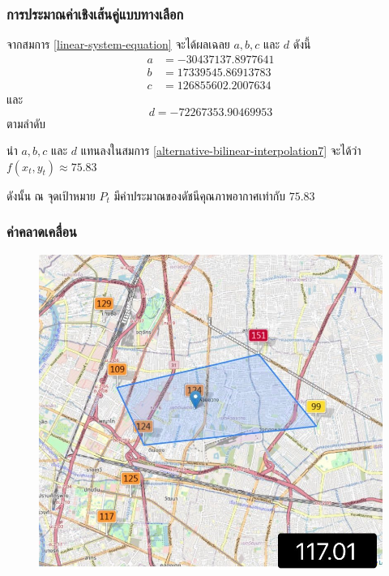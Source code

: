 \documentclass[12pt,aspectratio=169]{beamer}
\begin{document}
\begin{frame}
    \frametitle{การประมาณค่าเชิงเส้นคู่แบบทางเลือก}
   จากสมการ \eqref{linear-system-equation} จะได้ผลเฉลย $a,b,c$ และ $d$ ดังนี้ 
   \begin{align*}
    a&=-30437137.8977641\\
    b&=17339545.86913783\\
    c&=126855602.2007634
   \end{align*}
และ 
\begin{equation*}
d=-72267353.90469953
\end{equation*}
ตามลำดับ
\vspace{0.5cm}

\hspace{0.5cm} นำ $a,b,c$ และ $d$ แทนลงในสมการ \eqref{alternative-bilinear-interpolation7} จะได้ว่า $f(x_t,y_t) \approx 75.83$

ดังนั้น ณ จุดเป้าหมาย  $P_t$ มีค่าประมาณของดัชนีคุณภาพอากาศเท่ากับ $75.83$ 
\end{frame}

\begin{frame}
    \frametitle{ค่าคลาดเคลื่อน}
        \begin{center}
            \begin{figure}
                \includegraphics[scale=0.3]{img/error-test.jpg}
            \end{figure}
        \end{center}
    \end{frame}
\end{document}
